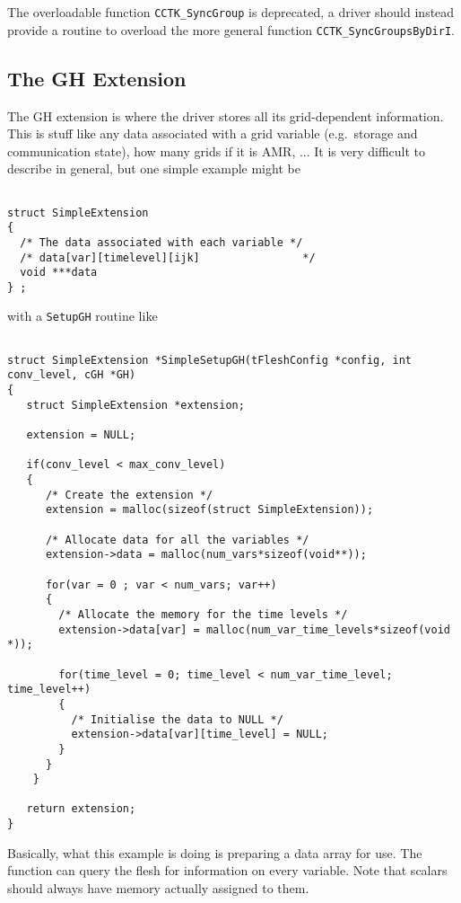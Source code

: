 The overloadable function {\tt CCTK\_SyncGroup} is deprecated, a driver should
instead provide a routine to overload the more general function
{\tt CCTK\_SyncGroupsByDirI}.

\subsection{The GH Extension}

The GH extension is where the driver stores all its grid-dependent information.
This is stuff like any data associated with a grid variable (e.g.\ storage and
communication state), how many grids if it is AMR, ...  It is very difficult to
describe in general, but one simple example might be

\begin{verbatim}

struct SimpleExtension
{
  /* The data associated with each variable */
  /* data[var][timelevel][ijk]                */
  void ***data
} ;

\end{verbatim}

with a {\tt SetupGH} routine like

\begin{verbatim}

struct SimpleExtension *SimpleSetupGH(tFleshConfig *config, int conv_level, cGH *GH)
{
   struct SimpleExtension *extension;

   extension = NULL;

   if(conv_level < max_conv_level)
   {
      /* Create the extension */
      extension = malloc(sizeof(struct SimpleExtension));

      /* Allocate data for all the variables */
      extension->data = malloc(num_vars*sizeof(void**));

      for(var = 0 ; var < num_vars; var++)
      {
        /* Allocate the memory for the time levels */
        extension->data[var] = malloc(num_var_time_levels*sizeof(void *));

        for(time_level = 0; time_level < num_var_time_level; time_level++)
        {
          /* Initialise the data to NULL */
          extension->data[var][time_level] = NULL;
        }
      }
    }

   return extension;
}

\end{verbatim}

Basically, what this example is doing is preparing a data array for use.  The
function can query the flesh for information on every variable.  Note that
scalars should always have memory actually assigned to them.

